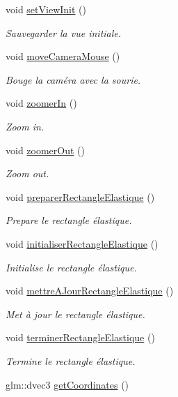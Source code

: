\begin{DoxyCompactItemize}
void \hyperlink{group__inf2990_gab3bc1f3520b17ed3d19287f3d411dd82}{set\+View\+Init} ()
\begin{DoxyCompactList}\small\item\em Sauvegarder la vue initiale. \end{DoxyCompactList}\item 
void \hyperlink{group__inf2990_gaba7107809948a77f8ef3bf2240bc2bc4}{move\+Camera\+Mouse} ()
\begin{DoxyCompactList}\small\item\em Bouge la caméra avec la sourie. \end{DoxyCompactList}\item 
void \hyperlink{group__inf2990_ga8f027fa8ccba48bada7b91b1bc32ed96}{zoomer\+In} ()
\begin{DoxyCompactList}\small\item\em Zoom in. \end{DoxyCompactList}\item 
void \hyperlink{group__inf2990_gaa2e1aeaa2fd10b16cf8b5f406d6270c8}{zoomer\+Out} ()
\begin{DoxyCompactList}\small\item\em Zoom out. \end{DoxyCompactList}\item 
void \hyperlink{group__inf2990_gaa5ea001f334158926e6c701478926ae9}{preparer\+Rectangle\+Elastique} ()
\begin{DoxyCompactList}\small\item\em Prepare le rectangle élastique. \end{DoxyCompactList}\item 
void \hyperlink{group__inf2990_ga6ccf25bd92d3bae6dfeebaf051c768f4}{initialiser\+Rectangle\+Elastique} ()
\begin{DoxyCompactList}\small\item\em Initialise le rectangle élastique. \end{DoxyCompactList}\item 
void \hyperlink{group__inf2990_ga382ae0540038d9ef65673af9d5d1b164}{mettre\+A\+Jour\+Rectangle\+Elastique} ()
\begin{DoxyCompactList}\small\item\em Met à jour le rectangle élastique. \end{DoxyCompactList}\item 
void \hyperlink{group__inf2990_ga1c99d4d88f05b70a20b36b51c07f31cf}{terminer\+Rectangle\+Elastique} ()
\begin{DoxyCompactList}\small\item\em Termine le rectangle élastique. \end{DoxyCompactList}\item 
\hypertarget{group__inf2990_ga4c28397e45d882d3d982ed68978e9e20}{}glm\+::dvec3 \hyperlink{group__inf2990_ga4c28397e45d882d3d982ed68978e9e20}{get\+Coordinates} ()\label{group__inf2990_ga4c28397e45d882d3d982ed68978e9e20}


\end{DoxyCompactItemize}

